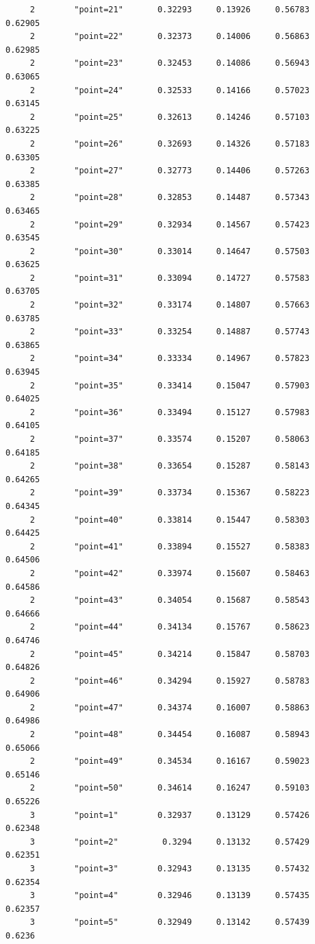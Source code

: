 \documentclass[
]{book}
\begin{document}
\begin{verbatim}
     2        "point=21"       0.32293     0.13926     0.56783     0.62905
     2        "point=22"       0.32373     0.14006     0.56863     0.62985
     2        "point=23"       0.32453     0.14086     0.56943     0.63065
     2        "point=24"       0.32533     0.14166     0.57023     0.63145
     2        "point=25"       0.32613     0.14246     0.57103     0.63225
     2        "point=26"       0.32693     0.14326     0.57183     0.63305
     2        "point=27"       0.32773     0.14406     0.57263     0.63385
     2        "point=28"       0.32853     0.14487     0.57343     0.63465
     2        "point=29"       0.32934     0.14567     0.57423     0.63545
     2        "point=30"       0.33014     0.14647     0.57503     0.63625
     2        "point=31"       0.33094     0.14727     0.57583     0.63705
     2        "point=32"       0.33174     0.14807     0.57663     0.63785
     2        "point=33"       0.33254     0.14887     0.57743     0.63865
     2        "point=34"       0.33334     0.14967     0.57823     0.63945
     2        "point=35"       0.33414     0.15047     0.57903     0.64025
     2        "point=36"       0.33494     0.15127     0.57983     0.64105
     2        "point=37"       0.33574     0.15207     0.58063     0.64185
     2        "point=38"       0.33654     0.15287     0.58143     0.64265
     2        "point=39"       0.33734     0.15367     0.58223     0.64345
     2        "point=40"       0.33814     0.15447     0.58303     0.64425
     2        "point=41"       0.33894     0.15527     0.58383     0.64506
     2        "point=42"       0.33974     0.15607     0.58463     0.64586
     2        "point=43"       0.34054     0.15687     0.58543     0.64666
     2        "point=44"       0.34134     0.15767     0.58623     0.64746
     2        "point=45"       0.34214     0.15847     0.58703     0.64826
     2        "point=46"       0.34294     0.15927     0.58783     0.64906
     2        "point=47"       0.34374     0.16007     0.58863     0.64986
     2        "point=48"       0.34454     0.16087     0.58943     0.65066
     2        "point=49"       0.34534     0.16167     0.59023     0.65146
     2        "point=50"       0.34614     0.16247     0.59103     0.65226
     3        "point=1"        0.32937     0.13129     0.57426     0.62348
     3        "point=2"         0.3294     0.13132     0.57429     0.62351
     3        "point=3"        0.32943     0.13135     0.57432     0.62354
     3        "point=4"        0.32946     0.13139     0.57435     0.62357
     3        "point=5"        0.32949     0.13142     0.57439      0.6236

\end{verbatim}
\end{document}
